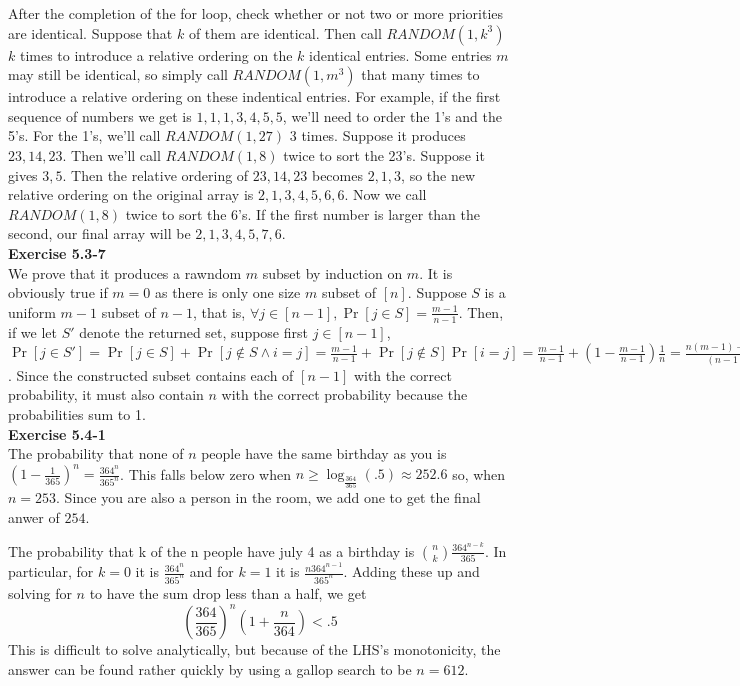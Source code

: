 \documentclass{article}
\begin{document}
After the completion of the for loop, check whether or not two or more priorities are identical.  Suppose that $k$ of them are identical.  Then call $RANDOM(1,k^3)$ $k$ times to introduce a relative ordering on the $k$ identical entries.  Some entries $m$ may still be identical, so simply call $RANDOM(1,m^3)$ that many times to introduce a relative ordering on these indentical entries.  For example, if the first sequence of numbers we get is $1, 1, 1, 3, 4, 5, 5$, we'll need to order the 1's and the 5's.  For the 1's, we'll call $RANDOM(1,27)$ 3 times.  Suppose it produces $23, 14, 23$.  Then we'll call $RANDOM(1,8)$ twice to sort the 23's.  Suppose it gives $3, 5$. Then the relative ordering of $23, 14, 23$ becomes $2, 1, 3$, so the new relative ordering on the original array is $2, 1, 3, 4, 5, 6, 6$.  Now we call $RANDOM(1,8)$ twice to sort the 6's.  If the first number is larger than the second, our final array will be $2, 1, 3, 4, 5, 7, 6$. \\

\noindent\textbf{Exercise 5.3-7}\\

We prove that it produces a rawndom $m$ subset by induction on $m$. It is obviously true if $m=0$ as there is only one size $m$ subset of $[n]$. Suppose $S$ is a uniform $m-1$ subset of $n-1$, that is, $\forall j\in[n-1], \Pr[j\in S] = \frac{m-1}{n-1}$. Then, if we let $S'$ denote the returned set, suppose first $j\in [n-1]$, $\Pr[j\in S'] = \Pr[j\in S] + \Pr[j\not\in S \wedge  i=j] = \frac{m-1}{n-1} + \Pr[j\not\in S]\Pr[i=j] = \frac{m-1}{n-1} + \left(1 - \frac{m-1}{n-1}\right)\frac{1}{n} = \frac{n(m-1) +n-m}{(n-1)n} = \frac{nm -m}{(n-1)n} = \frac{m}{n}$. Since the constructed subset contains each of $[n-1]$ with the correct probability, it must also contain $n$ with the correct probability because the probabilities sum to 1.\\



\noindent\textbf{Exercise 5.4-1}\\

The probability that none of $n$ people have the same birthday as you is $(1-\frac{1}{365})^n= \frac{364^n}{365^n}$. This falls below zero when $n\ge \log_{\frac{364}{365}}(.5) \approx 252.6$ so, when $n=253$. Since you are also a person in the room, we add one to get the final anwer of $254$.

The probability that k of the n people have july 4 as a birthday is $\binom{n}{k} \frac{364^{n-k}}{365}$. In particular, for $k=0$ it is $\frac{364^n}{365^n}$ and for $k=1$ it is $\frac{n364^{n-1}}{365^n}$. Adding these up and solving for $n$ to have the sum drop less than a half, we get
\[
\left(\frac{364}{365}\right)^n \left( 1 + \frac{n}{364}\right) <.5
\]
This is difficult to solve analytically, but  because of the LHS's monotonicity, the answer can be found rather quickly by using a gallop search to be $n=612$.\\
\end{document}
